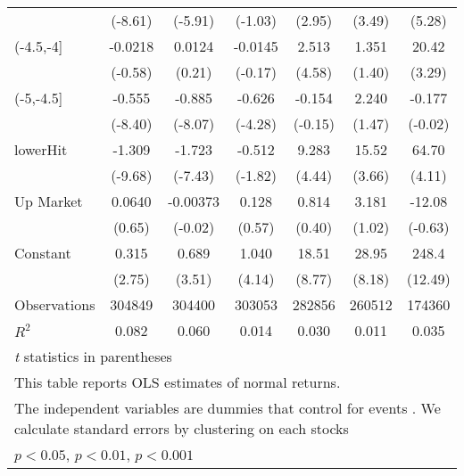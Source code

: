 {\begin{tabular}{l*{6}{c}}
                    &     (-8.61)         &     (-5.91)         &     (-1.03)         &      (2.95)         &      (3.49)         &      (5.28)         \\
[1em]
(-4.5,-4]           &     -0.0218         &      0.0124         &     -0.0145         &       2.513\sym{***}&       1.351         &       20.42\sym{**} \\
                    &     (-0.58)         &      (0.21)         &     (-0.17)         &      (4.58)         &      (1.40)         &      (3.29)         \\
[1em]
(-5,-4.5]           &      -0.555\sym{***}&      -0.885\sym{***}&      -0.626\sym{***}&      -0.154         &       2.240         &      -0.177         \\
                    &     (-8.40)         &     (-8.07)         &     (-4.28)         &     (-0.15)         &      (1.47)         &     (-0.02)         \\
[1em]
lowerHit            &      -1.309\sym{***}&      -1.723\sym{***}&      -0.512         &       9.283\sym{***}&       15.52\sym{***}&       64.70\sym{***}\\
                    &     (-9.68)         &     (-7.43)         &     (-1.82)         &      (4.44)         &      (3.66)         &      (4.11)         \\
[1em]
Up Market           &      0.0640         &    -0.00373         &       0.128         &       0.814         &       3.181         &      -12.08         \\
                    &      (0.65)         &     (-0.02)         &      (0.57)         &      (0.40)         &      (1.02)         &     (-0.63)         \\
[1em]
Constant            &       0.315\sym{**} &       0.689\sym{***}&       1.040\sym{***}&       18.51\sym{***}&       28.95\sym{***}&       248.4\sym{***}\\
                    &      (2.75)         &      (3.51)         &      (4.14)         &      (8.77)         &      (8.18)         &     (12.49)         \\
\hline
Observations        &      304849         &      304400         &      303053         &      282856         &      260512         &      174360         \\
\(R^{2}\)           &       0.082         &       0.060         &       0.014         &       0.030         &       0.011         &       0.035         \\
\hline\hline
\multicolumn{7}{l}{\footnotesize \textit{t} statistics in parentheses}\\
\multicolumn{7}{l}{\footnotesize This table reports OLS estimates of normal returns.}\\
\multicolumn{7}{l}{\footnotesize The independent variables are dummies that control for events . We calculate standard errors by clustering on each stocks}\\
\multicolumn{7}{l}{\footnotesize \sym{*} \(p<0.05\), \sym{**} \(p<0.01\), \sym{***} \(p<0.001\)}\\
\end{tabular}
}
